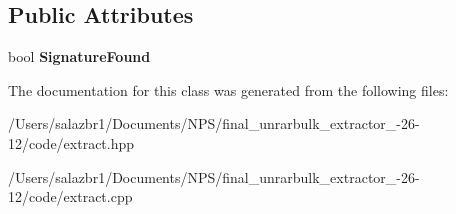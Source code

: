 \subsection*{Public Attributes}
\begin{DoxyCompactItemize}
\item 
\hypertarget{class_cmd_extract_a1b2ad1984fde266e359bc910a80575cf}{bool {\bfseries Signature\-Found}}\label{class_cmd_extract_a1b2ad1984fde266e359bc910a80575cf}

\end{DoxyCompactItemize}


The documentation for this class was generated from the following files\-:\begin{DoxyCompactItemize}
\item 
/\-Users/salazbr1/\-Documents/\-N\-P\-S/final\-\_\-unrarbulk\-\_\-extractor\-\_-\/26-\/12/code/extract.\-hpp\item 
/\-Users/salazbr1/\-Documents/\-N\-P\-S/final\-\_\-unrarbulk\-\_\-extractor\-\_-\/26-\/12/code/extract.\-cpp\end{DoxyCompactItemize}
